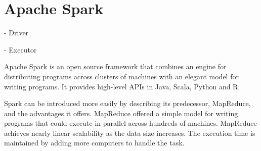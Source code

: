\documentclass[12pt,a4paper,english
]{tutthesis}
\begin{document}
%
%
%
%
%
%
%
%

\chapter{Apache Spark}

- Driver

- Executor

Apache Spark is an open source framework that combines an engine for distributing programs across clusters of machines with an elegant model for writing programs. \cite{ryza15} It provides high-level APIs in Java, Scala, Python and R.

Spark can be introduced more easily by describing its predecessor, MapReduce, and the advantages it offers. MapReduce offered a simple model for writing programs that could execute in parallel across hundreds of machines. MapReduce achieves nearly linear scalability as the data size increases. The execution time is maintained by adding more computers to handle the task.
\end{document}
